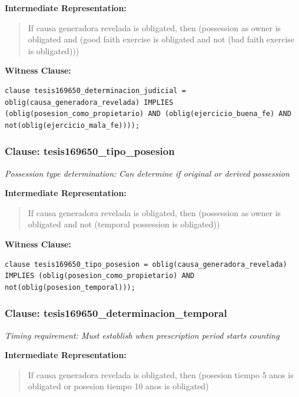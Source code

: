 \documentclass[11pt,a4paper]{article}
\begin{document}
\textbf{Intermediate Representation:}

\begin{quote}
If causa generadora revelada is obligated, then (possession as owner is obligated and (good faith exercise is obligated and not (bad faith exercise is obligated)))
\end{quote}

\textbf{Witness Clause:}

\begin{lstlisting}[style=witnessstyle, language=Witness]
clause tesis169650_determinacion_judicial = oblig(causa_generadora_revelada) IMPLIES (oblig(posesion_como_propietario) AND (oblig(ejercicio_buena_fe) AND not(oblig(ejercicio_mala_fe))));
\end{lstlisting}

\subsubsection{Clause: tesis169650\_tipo\_posesion}

\textit{Possession type determination: Can determine if original or derived possession}

\textbf{Intermediate Representation:}

\begin{quote}
If causa generadora revelada is obligated, then (possession as owner is obligated and not (temporal possession is obligated))
\end{quote}

\textbf{Witness Clause:}

\begin{lstlisting}[style=witnessstyle, language=Witness]
clause tesis169650_tipo_posesion = oblig(causa_generadora_revelada) IMPLIES (oblig(posesion_como_propietario) AND not(oblig(posesion_temporal)));
\end{lstlisting}

\subsubsection{Clause: tesis169650\_determinacion\_temporal}

\textit{Timing requirement: Must establish when prescription period starts counting}

\textbf{Intermediate Representation:}

\begin{quote}
If causa generadora revelada is obligated, then (posesion tiempo 5 anos is obligated or posesion tiempo 10 anos is obligated)
\end{quote}
\end{document}
